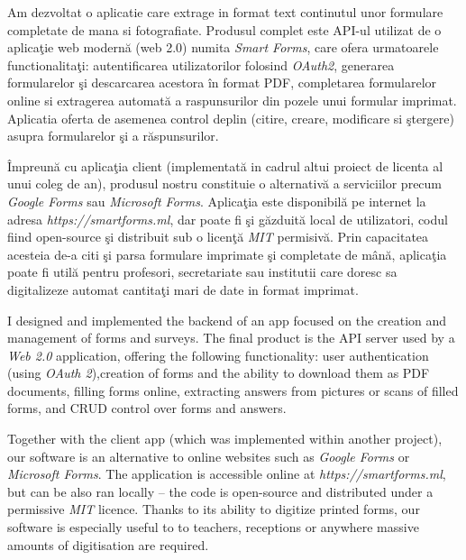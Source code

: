 \documentclass[11pt, a4paper]{report}
\newenvironment{abstractpage}
  {\cleardoublepage\vspace*{\fill}\thispagestyle{empty}}
  {\vfill\cleardoublepage}
\renewenvironment{abstract}[1]
  {\bigskip
  \begin{center}\bfseries\abstractname\end{center}}
  {\par\bigskip}
\begin{document}
\begin{abstractpage}

  \begin{abstract}{}
  Am dezvoltat o aplicatie care extrage in format text continutul unor formulare completate de mana si fotografiate.
  Produsul complet este API-ul utilizat de o aplica\c{t}ie web modern\u{a} (web 2.0) numita \textit{Smart Forms}, care ofera urmatoarele functionalita\c{t}i: autentificarea utilizatorilor folosind \textit{OAuth2}, generarea formularelor \c{s}i descarcarea acestora \^{i}n format PDF, completarea formularelor online si extragerea automat\u{a} a raspunsurilor din pozele unui formular imprimat. Aplicatia oferta de asemenea control deplin (citire, creare, modificare si \c{s}tergere) asupra formularelor \c{s}i a r\u{a}spunsurilor.
  
  \^{I}mpreun\u{a} cu aplica\c{t}ia client (implementat\u{a} in cadrul altui proiect de licenta al unui coleg de an), produsul nostru constituie o alternativ\u a a serviciilor precum \textit{Google Forms} sau \textit{Microsoft Forms}. Aplica\c tia este disponibil\u a pe internet la adresa \textit{https://smartforms.ml}, dar poate fi \c si g\u azduit\u a local de utilizatori, codul fiind open-source \c si distribuit sub o licen\c t\u a \textit{MIT} permisiv\u a. Prin capacitatea acesteia de-a citi \c si parsa formulare imprimate \c si completate de m\^ an\u a, aplica\c tia poate fi util\u a pentru profesori, secretariate sau institutii care doresc sa digitalizeze automat cantita\c ti mari de date in format imprimat. 
  
  \end{abstract}
  
  \begin{abstract}{}
  I designed and implemented the backend of an app focused on the creation and management of forms and surveys. The final product is the API server used by a \textit{Web 2.0} application, offering the following functionality: user authentication (using \textit{OAuth 2}),creation of forms and the ability to download them as PDF documents, filling forms online, extracting answers from pictures or scans of filled forms, and CRUD control over forms and answers.
  
  Together with the client app (which was implemented within another project), our software is an alternative to online websites such as \textit{Google Forms} or \textit{Microsoft Forms}. The application is accessible online at \textit{https://smartforms.ml}, but can be also ran locally -- the code is open-source and distributed under a permissive \textit{MIT} licence. Thanks to its ability to digitize printed forms, our software is especially useful to to teachers, receptions or anywhere massive amounts of digitisation are required.
  \end{abstract}
  
\end{abstractpage}
\end{document}
